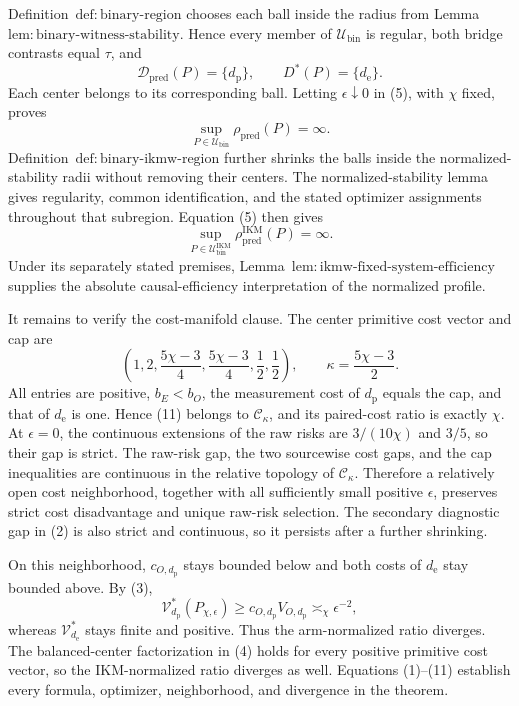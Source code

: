 Definition~\(\mathrm{def{:}binary\text{-}region}\) chooses each ball inside the radius from Lemma~\(\mathrm{lem{:}binary\text{-}witness\text{-}stability}\). Hence every member of \(\mathcal U_{\mathrm{bin}}\) is regular, both bridge contrasts equal \(\tau\), and
\[
 \mathcal D_{\mathrm{pred}}(P)=\{d_{\mathrm p}\},
 \qquad D^*(P)=\{d_{\mathrm e}\}. \tag{8}
\]
Each center belongs to its corresponding ball. Letting \(\epsilon\downarrow0\) in (5), with \(\chi\) fixed, proves
\[
 \sup_{P\in\mathcal U_{\mathrm{bin}}}\rho_{\mathrm{pred}}(P)=\infty. \tag{9}
\]
Definition~\(\mathrm{def{:}binary\text{-}ikmw\text{-}region}\) further shrinks the balls inside the normalized-stability radii without removing their centers. The normalized-stability lemma gives regularity, common identification, and the stated optimizer assignments throughout that subregion. Equation (5) then gives
\[
 \sup_{P\in\mathcal U_{\mathrm{bin}}^{\mathrm{IKM}}}
 \rho_{\mathrm{pred}}^{\mathrm{IKM}}(P)=\infty. \tag{10}
\]
Under its separately stated premises, Lemma~\(\mathrm{lem{:}ikmw\text{-}fixed\text{-}system\text{-}efficiency}\) supplies the absolute causal-efficiency interpretation of the normalized profile.

It remains to verify the cost-manifold clause. The center primitive cost vector and cap are
\[
 \left(1,2,\frac{5\chi-3}{4},\frac{5\chi-3}{4},\frac12,\frac12\right),
 \qquad \kappa=\frac{5\chi-3}{2}. \tag{11}
\]
All entries are positive, \(b_E<b_O\), the measurement cost of \(d_{\mathrm p}\) equals the cap, and that of \(d_{\mathrm e}\) is one. Hence (11) belongs to \(\mathcal C_\kappa\), and its paired-cost ratio is exactly \(\chi\). At \(\epsilon=0\), the continuous extensions of the raw risks are \(3/(10\chi)\) and \(3/5\), so their gap is strict. The raw-risk gap, the two sourcewise cost gaps, and the cap inequalities are continuous in the relative topology of \(\mathcal C_\kappa\). Therefore a relatively open cost neighborhood, together with all sufficiently small positive \(\epsilon\), preserves strict cost disadvantage and unique raw-risk selection. The secondary diagnostic gap in (2) is also strict and continuous, so it persists after a further shrinking.

On this neighborhood, \(c_{O,d_{\mathrm p}}\) stays bounded below and both costs of \(d_{\mathrm e}\) stay bounded above. By (3),
\[
 \mathcal V_{d_{\mathrm p}}^*(P_{\chi,\epsilon})
 \ge c_{O,d_{\mathrm p}}V_{O,d_{\mathrm p}}\asymp_\chi\epsilon^{-2},
\]
whereas \(\mathcal V_{d_{\mathrm e}}^*\) stays finite and positive. Thus the arm-normalized ratio diverges. The balanced-center factorization in (4) holds for every positive primitive cost vector, so the IKM-normalized ratio diverges as well. Equations (1)--(11) establish every formula, optimizer, neighborhood, and divergence in the theorem.